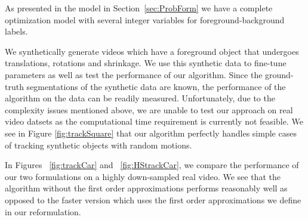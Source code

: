 As presented in the model in Section~\ref{sec:ProbForm} we have a complete optimization
model with several integer variables for foreground-background labels.




%
%


We synthetically generate videos which have a foreground object that undergoes translations, rotations and shrinkage. We use this synthetic data to fine-tune parameters as well as test the performance of our algorithm. Since the ground-truth segmentations of the synthetic data are known, the performance of the algorithm on the data can be readily measured. Unfortunately, due to the complexity issues mentioned above, we are unable to test our approach on real video datsets as the computational time requirement is currently not feasible. We see in Figure \ref{fig:trackSquare} that our algorithm perfectly handles simple cases of tracking synthetic objects with random motions.

In Figures ~\ref{fig:trackCar} and ~\ref{fig:HStrackCar}, we compare the performance of our two formulations on a highly down-sampled real video. We see that the algorithm without the first order approximations performs reasonably well as opposed to the faster version which uses the first order approximations we define in our reformulation.